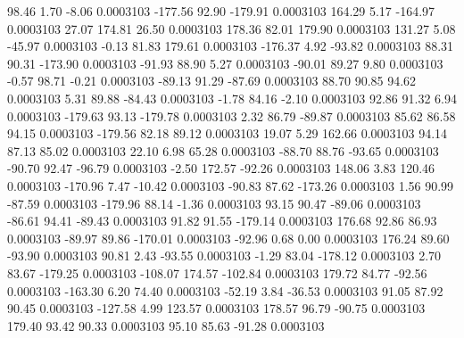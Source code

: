        98.46        1.70       -8.06     0.0003103
     -177.56       92.90     -179.91     0.0003103
      164.29        5.17     -164.97     0.0003103
       27.07      174.81       26.50     0.0003103
      178.36       82.01      179.90     0.0003103
      131.27        5.08      -45.97     0.0003103
       -0.13       81.83      179.61     0.0003103
     -176.37        4.92      -93.82     0.0003103
       88.31       90.31     -173.90     0.0003103
      -91.93       88.90        5.27     0.0003103
      -90.01       89.27        9.80     0.0003103
       -0.57       98.71       -0.21     0.0003103
      -89.13       91.29      -87.69     0.0003103
       88.70       90.85       94.62     0.0003103
        5.31       89.88      -84.43     0.0003103
       -1.78       84.16       -2.10     0.0003103
       92.86       91.32        6.94     0.0003103
     -179.63       93.13     -179.78     0.0003103
        2.32       86.79      -89.87     0.0003103
       85.62       86.58       94.15     0.0003103
     -179.56       82.18       89.12     0.0003103
       19.07        5.29      162.66     0.0003103
       94.14       87.13       85.02     0.0003103
       22.10        6.98       65.28     0.0003103
      -88.70       88.76      -93.65     0.0003103
      -90.70       92.47      -96.79     0.0003103
       -2.50      172.57      -92.26     0.0003103
      148.06        3.83      120.46     0.0003103
     -170.96        7.47      -10.42     0.0003103
      -90.83       87.62     -173.26     0.0003103
        1.56       90.99      -87.59     0.0003103
     -179.96       88.14       -1.36     0.0003103
       93.15       90.47      -89.06     0.0003103
      -86.61       94.41      -89.43     0.0003103
       91.82       91.55     -179.14     0.0003103
      176.68       92.86       86.93     0.0003103
      -89.97       89.86     -170.01     0.0003103
      -92.96        0.68        0.00     0.0003103
      176.24       89.60      -93.90     0.0003103
       90.81        2.43      -93.55     0.0003103
       -1.29       83.04     -178.12     0.0003103
        2.70       83.67     -179.25     0.0003103
     -108.07      174.57     -102.84     0.0003103
      179.72       84.77      -92.56     0.0003103
     -163.30        6.20       74.40     0.0003103
      -52.19        3.84      -36.53     0.0003103
       91.05       87.92       90.45     0.0003103
     -127.58        4.99      123.57     0.0003103
      178.57       96.79      -90.75     0.0003103
      179.40       93.42       90.33     0.0003103
       95.10       85.63      -91.28     0.0003103
